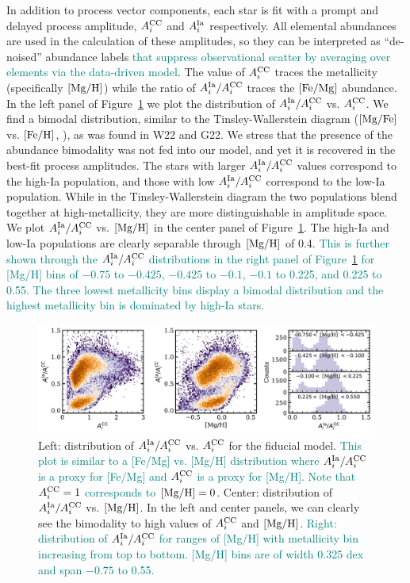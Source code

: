 \documentclass[modern]{aastex631}
\newcommand{\mgfe}[0]{[{\rm Mg/Fe}]}
\newcommand{\femg}{[{\rm Fe}/{\rm Mg}]}
\newcommand{\mgh}{[{\rm Mg}/{\rm H}]}
\newcommand{\feh}[0]{[{\rm Fe/H}]}
\newcommand{\Acc}{A^{\rm CC}_{i}}
\newcommand{\AIa}{A^{\rm Ia}_{i}}
\newcommand{\add}[1]{\textcolor{teal}{#1}}
\begin{document}
In addition to process vector components, each star is fit with a prompt and delayed process amplitude, $\Acc$ and $\AIa$ respectively. All elemental abundances are used in the calculation of these amplitudes, so they can be interpreted as ``de-noised'' abundance labels \add{that suppress observational scatter by averaging over elements via the data-driven model}. The value of $\Acc$ traces the metallicity (specifically $\mgh$) while the ratio of $\AIa/\Acc$ traces the $\femg$ abundance. In the left panel of Figure~\ref{fig:As} we plot the distribution of $\AIa/\Acc$ vs. $\Acc$. We find a bimodal distribution, similar to the Tinsley-Wallerstein diagram ($\mgfe$ vs. $\feh$, \citealp{wallerstein1962, tinsley1979, tinsley1980}), as was found in W22 and G22. We stress that the presence of the abundance bimodality was not fed into our model, and yet it is recovered in the best-fit process amplitudes. The stars with larger $\AIa/\Acc$ values correspond to the high-Ia population, and those with low $\AIa/\Acc$ correspond to the low-Ia population. While in the Tinsley-Wallerstein diagram the two populations blend together at high-metallicity, they are more distinguishable in amplitude space. We plot $\AIa/\Acc$ vs. $\mgh$ in the center panel of Figure~\ref{fig:As}. The high-Ia and low-Ia populations are clearly separable through $\mgh$ of 0.4. \add{This is further shown through the $\AIa/\Acc$ distributions in the right panel of Figure~\ref{fig:As} for [Mg/H] bins of $-0.75$ to $-0.425$, $-0.425$ to $-0.1$, $-0.1$ to 0.225, and 0.225 to 0.55. The three lowest metallicity bins display a bimodal distribution and the highest metallicity bin is dominated by high-Ia stars.}

\begin{figure}[htb!]
    \centering
    \includegraphics[width=\textwidth]{Paper/Figures/As.pdf}
    \caption{Left: distribution of $\AIa/\Acc$ vs. $\Acc$ for the fiducial model. \add{This plot is similar to a [Fe/Mg] vs. [Mg/H] distribution where $\AIa/\Acc$ is a proxy for [Fe/Mg] and $\Acc$ is a proxy for [Mg/H]. Note that $\Acc = 1$ corresponds to $\mgh = 0$}. Center: distribution of $\AIa/\Acc$ vs. $\mgh$. In the left and center panels, we can clearly see the bimodality to high values of $\Acc$ and $\mgh$. \add{Right: distribution of $\AIa/\Acc$ for ranges of [Mg/H] with metallicity bin increasing from top to bottom. [Mg/H] bins are of width 0.325 dex and span $-0.75$ to 0.55.}}
    \label{fig:As}
\end{figure}
\end{document}
